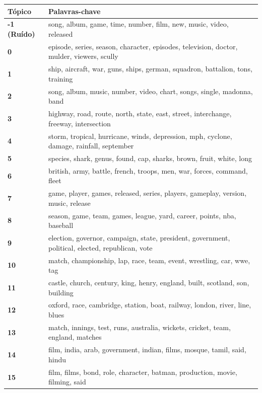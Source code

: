 \begin{table}[htpb]
    \centering
    \scriptsize
    \begin{tabularx}{\textwidth}{@{}l X@{}}
        \toprule
        \textbf{Tópico} & \textbf{Palavras-chave} \\
        \midrule
        \textbf{-1 (Ruído)} & song, album, game, time, number, film, new, music, video, released \\
        \textbf{0} & episode, series, season, character, episodes, television, doctor, mulder, viewers, scully \\
        \textbf{1} & ship, aircraft, war, guns, ships, german, squadron, battalion, tons, training \\
        \textbf{2} & song, album, music, number, video, chart, songs, single, madonna, band \\
        \textbf{3} & highway, road, route, north, state, east, street, interchange, freeway, intersection \\
        \textbf{4} & storm, tropical, hurricane, winds, depression, mph, cyclone, damage, rainfall, september \\
        \textbf{5} & species, shark, genus, found, cap, sharks, brown, fruit, white, long \\
        \textbf{6} & british, army, battle, french, troops, men, war, forces, command, fleet \\
        \textbf{7} & game, player, games, released, series, players, gameplay, version, music, release \\
        \textbf{8} & season, game, team, games, league, yard, career, points, nba, baseball \\
        \textbf{9} & election, governor, campaign, state, president, government, political, elected, republican, vote \\
        \textbf{10} & match, championship, lap, race, team, event, wrestling, car, wwe, tag \\
        \textbf{11} & castle, church, century, king, henry, england, built, scotland, son, building \\
        \textbf{12} & oxford, race, cambridge, station, boat, railway, london, river, line, blues \\
        \textbf{13} & match, innings, test, runs, australia, wickets, cricket, team, england, matches \\
        \textbf{14} & film, india, arab, government, indian, films, mosque, tamil, said, hindu \\
        \textbf{15} & film, films, bond, role, character, batman, production, movie, filming, said \\

\end{tabularx}
\end{table}
